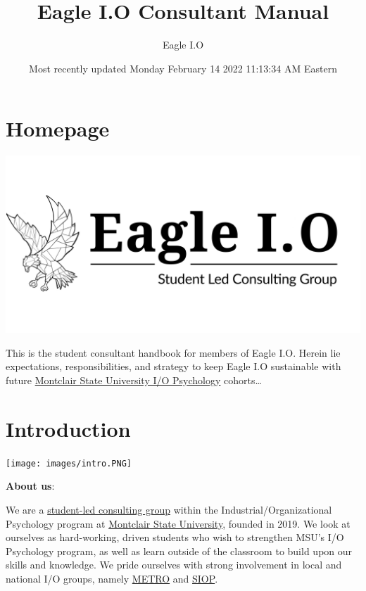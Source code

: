 \documentclass[
]{book}
\title{Eagle I.O Consultant Manual}
\author{Eagle I.O}
\date{Most recently updated Monday February 14 2022 11:13:34 AM Eastern}
\begin{document}
\maketitle

{
\setcounter{tocdepth}{4}
\tableofcontents
}
\hypertarget{homepage}{%
\chapter*{Homepage}\label{homepage}}

\includegraphics{images/eagleio dot.jpg}

This is the student consultant handbook for members of Eagle I.O. Herein lie expectations, responsibilities, and strategy to keep Eagle I.O sustainable with future \href{https://www.montclair.edu/psychology/graduate-programs/industrial-organizational-psychology/}{Montclair State University I/O Psychology} cohorts\ldots{}

\hypertarget{introduction}{%
\chapter{Introduction}\label{introduction}}

\texttt{[image: images/intro.PNG]}

\textbf{About us}:

We are a \href{https://eagle-io.weebly.com/}{student-led consulting group} within the Industrial/Organizational Psychology program at \href{https://www.montclair.edu/psychology/graduate-programs/industrial-organizational-psychology/}{Montclair State University}, founded in 2019. We look at ourselves as hard-working, driven students who wish to strengthen MSU's I/O Psychology program, as well as learn outside of the classroom to build upon our skills and knowledge. We pride ourselves with strong involvement in local and national I/O groups, namely \href{https://metroapppsych.com/}{METRO} and \href{https://siop.org}{SIOP}.
\end{document}
